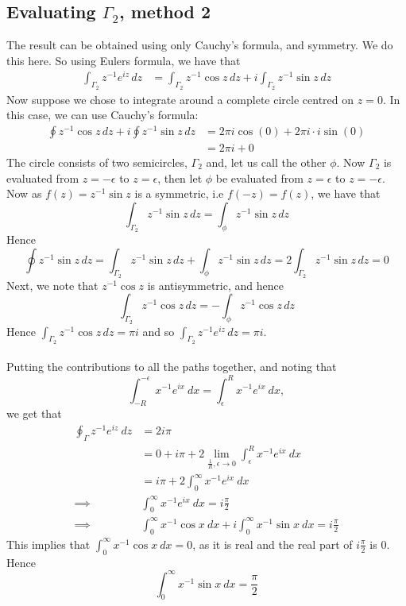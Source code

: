 \subsection*{Evaluating $\Gamma_2$, method 2}
The result can be obtained using only Cauchy's formula, and symmetry. We do this here. So using Eulers formula, we have that 
\begin{align*}
 \int_{\Gamma_2} z^{-1}e^{iz}\, dz&= \int_{\Gamma_2} z^{-1}\cos z\, dz+i \int_{\Gamma_2} z^{-1}\sin z\, dz
\end{align*}
Now suppose we chose to integrate around a complete circle centred on $z=0$. In this case, we can use Cauchy's formula:
\begin{align*}
 \oint z^{-1}\cos z\, dz+i \oint z^{-1}\sin z\, dz&=2\pi i \cos(0)+2\pi i \cdot i \sin (0)\\
&=2 \pi i+0
\end{align*}
The circle consists of two semicircles, $\Gamma_2$ and, let us call the other $\phi$. Now $\Gamma_2$ is evaluated from $z=-\epsilon$ to $z=\epsilon$, then let $\phi$ be evaluated from $z=\epsilon$ to $z=-\epsilon$. Now as $f(z)=z^{-1}\sin z$ is a symmetric, i.e $f(-z)=f(z)$, we have that $$\int_{\Gamma_2} z^{-1}\sin z\, dz= \int_{\phi} z^{-1}\sin z\, dz$$
Hence 
$$\oint z^{-1}\sin z\, dz=\int_{\Gamma_2} z^{-1}\sin z\, dz+ \int_{\phi} z^{-1}\sin z\, dz=2 \int_{\Gamma_2} z^{-1}\sin z\, dz=0$$
Next, we note that $z^{-1}\cos z$ is antisymmetric, and hence 
$$\int_{\Gamma_2} z^{-1}\cos z\, dz=- \int_{\phi} z^{-1}\cos z\, dz$$ 
Hence $\int_{\Gamma_2} z^{-1}\cos z\, dz=\pi i$ and so $\int_{\Gamma_2} z^{-1}e^{iz} \, dz=\pi i$.\\ \\
Putting the contributions to all the paths together, and noting that
$$\int_{-R}^{-\epsilon} x^{-1}e^{ix}\ dx=\int^{R}_{\epsilon} x^{-1}e^{ix}\ dx,$$
we get that
\begin{align*}
\oint_\Gamma z^{-1}e^{iz} \ dz &=2i\pi \\
&=0+i\pi+2\lim_{\frac{1}{R},\epsilon\to 0}\int^{R}_{\epsilon} x^{-1}e^{ix}\ dx\\
&=i\pi+2\int^{\infty}_{0} x^{-1}e^{ix}\ dx\\
\implies  \ \ \ \ \ \ \ &\int^{\infty}_{0} x^{-1}e^{ix}\ dx =i\frac{\pi}{2} \\
\implies  \ \ \ \ \ \ \ &\int^{\infty}_{0} x^{-1}\cos x\ dx+i\int^{\infty}_{0} x^{-1}\sin x\ dx =i\frac{\pi}{2}
\end{align*}
This implies that $\int^{\infty}_{0} x^{-1}\cos x\ dx=0$, as it is real and the real part of $i\frac{\pi}{2}$ is 0. Hence
$$\int^{\infty}_{0} x^{-1}\sin x\ dx =\frac{\pi}{2}$$


